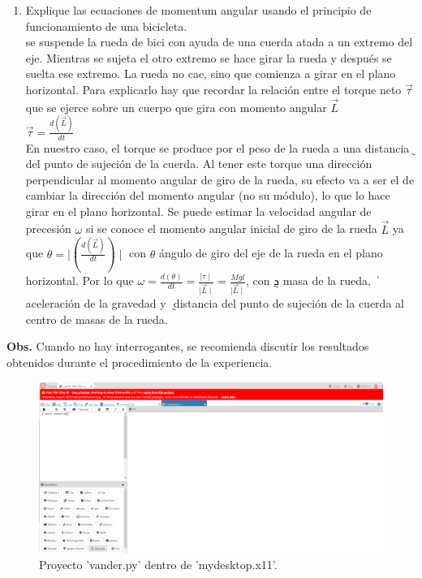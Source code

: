 \documentclass[12pt,oneside,spanish]{article}
\begin{document}
\begin{enumerate}
    \item Explique las ecuaciones de momentum angular usando el principio de funcionamiento de una bicicleta.\\
   se suspende la rueda de bici con ayuda de una cuerda atada a un extremo del eje. Mientras se sujeta el otro extremo se hace girar la rueda y después se suelta ese extremo. La rueda no cae, sino que comienza a girar en el plano horizontal. Para explicarlo hay que recordar la relación entre el torque neto $ \vec{\tau} $ que se ejerce sobre un cuerpo que gira con momento angular $ \vec{L}$\\
   $\vec{\tau} = \frac{d(\vec{L})}{dt} $\\
   En nuestro caso, el torque se produce por el peso de la rueda a una distancia݈ del punto de sujeción de la cuerda. Al tener este torque una dirección perpendicular al momento angular de giro de la rueda, su efecto va a ser el de cambiar la dirección del momento angular (no su módulo), lo que lo hace girar en el plano horizontal. Se puede estimar la velocidad angular de
precesión $ \omega $ si se conoce el momento angular inicial de giro de la rueda $ \vec{L} $ ya que $ \theta = \mid (\frac{d(\vec{L})}{dt}) \mid $ con $ \theta$ ángulo de giro del eje de la rueda en el plano horizontal. Por lo que  $ \omega = \frac{d(\theta)}{dt}=\frac{\mid \tau \mid}{\mid \vec{L} \mid } = \frac{Mgl}{\mid \vec{L} \mid } $, con ܯ masa de la rueda, ݃
aceleración de la gravedad y ݈ distancia del punto de sujeción de la cuerda al
centro de masas de la rueda. 

    
\end{enumerate}
\textbf{Obs.} Cuando no hay interrogantes, se recomienda discutir los resultados obtenidos durante el procedimiento de la experiencia.

\begin{figure}
    \centering
    \includegraphics[width=12cm]{vander.png}
    \caption{Proyecto 'vander.py' dentro de 'mydesktop.x11'.}
    \label{fig:vander}
\end{figure}
\end{document}

